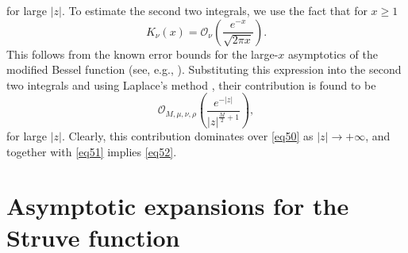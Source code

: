 \documentclass[a4paper,twoside,10pt]{amsart}
\numberwithin{equation}{section}
\begin{document}
for large $\left|z\right|$. To estimate the second two integrals, we use the fact that for $x\geq 1$
\[
K_\nu  \left( x \right) = \mathcal{O}_\nu  \left( {\frac{{e^{ - x} }}{{\sqrt {2\pi x} }}} \right).
\]
This follows from the known error bounds for the large-$x$ asymptotics of the modified Bessel function (see, e.g., \cite[10.40.iii]{NIST}). Substituting this expression into the second two integrals and using Laplace's method \cite[pp. 80--82]{Olver}, their contribution is found to be
\[
\mathcal{O}_{M,\mu ,\nu ,\rho } \left( {\frac{{e^{ - \left| z \right|} }}{{\left| z \right|^{\frac{M}{2} + 1} }}} \right),
\]
for large $\left|z\right|$. Clearly, this contribution dominates over \eqref{eq50} as $\left|z\right|\to +\infty$, and together with \eqref{eq51} implies \eqref{eq52}.

\section{Asymptotic expansions for the Struve function}\label{section5}
\end{document}
